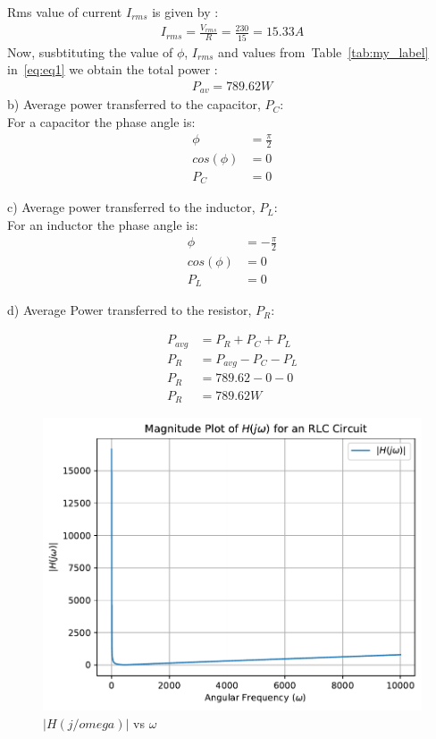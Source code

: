 \documentclass[journal,12pt,onecolumn]{IEEEtran}
\newcommand\tabref{Table~\ref}
\theoremstyle{remark}
\providecommand{\abs}[1]{\left\vert#1\right\vert}
\begin{document}
Rms value of current $I_{rms}$ is given by  :
\begin{align}
	I_{rms}=\frac{V_{rms}}{R}=\frac{230}{15}=15.33A
\end{align}
Now, susbtituting the value of $\phi$, $I_{rms}$ and values from~\tabref{tab:my_label} in~\eqref{eq:eq1} we obtain the total power :
\begin{align}
	P_{av}=789.62 W
\end{align}
b) Average power transferred to the capacitor, $P_C$:\\
For a capacitor the phase angle is:
\begin{align}
	\phi &= \frac{\pi}{2}\\
	cos(\phi) &= 0\\
	P_C &= 0
\end{align}	  

c) Average power transferred to the inductor, $P_L$:\\
For an inductor the phase angle is:
\begin{align}
	\phi &= -\frac{\pi}{2}\\
	cos(\phi) &= 0\\
	P_L &= 0
\end{align}	 

d) Average Power transferred to the resistor, $P_R$:

\begin{align}
	P_{avg} &= P_{R} + P_{C} + P_{L}\\
	P_{R} &= P_{avg} - P_{C} - P_{L}\\
	P_{R} &= 789.62 -0-0\\
	P_R &= 789.62W
\end{align}

\newpage
\begin{figure}[!h]
	\centering
	\includegraphics[width=\columnwidth]{figs/garph1.pdf}
	\caption{$\abs{H(j/omega)}$ vs $\omega$}
	\label{fig:magnitude_plot}
\end{figure}
\end{document}
